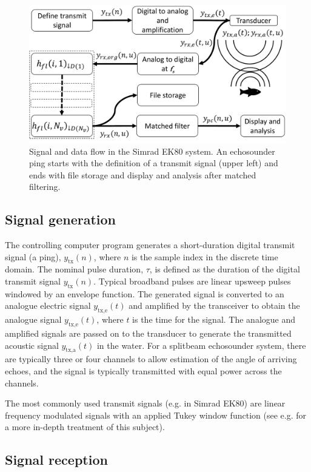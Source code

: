 \documentclass[preprint,12pt,TurnOnLineNumbers]{JASAnew}
\newcommand{\ek}{Simrad EK80}
\newcommand{\timesym}{t}
\newcommand{\samplesymt}{n}
\newcommand{\tnom}{\tau}
\newcommand{\ytxe}{y_{\textrm{tx,e}}}
\newcommand{\ytxa}{y_{\textrm{tx,a}}}
\newcommand{\ytx}{y_{\textrm{tx}}}
\begin{document}
\begin{figure}
\includegraphics[width=16cm]{Fig_ek_sys}
\caption{\label{fi:ek_sys} Signal and data flow in the \ek{} system. An echosounder ping starts with the definition of a transmit signal (upper left) and ends with file storage and display and analysis after matched filtering.}
\end{figure}

\subsection{Signal generation}

The controlling computer program generates a short-duration digital transmit signal (a ping), $\ytx(\samplesymt)$, where $\samplesymt$ is the sample index in the discrete time domain. The nominal pulse duration, $\tnom$, is defined as the duration of the digital transmit signal $\ytx(\samplesymt)$.
Typical broadband pulses are linear upsweep pulses windowed by an envelope function. The generated signal is converted to an analogue electric signal $\ytxe(\timesym)$ and amplified by the transceiver to obtain the analogue signal $\ytxe(\timesym)$, where $\timesym$ is the time for the signal. The analogue and amplified signals are passed on to the transducer to generate the transmitted acoustic signal $\ytxa(\timesym)$ in the water. For a splitbeam echosounder system, there are typically three or four channels to allow estimation of the angle of arriving echoes, and the signal is typically transmitted with equal power across the channels.

The most commonly used transmit signals (e.g. in Simrad EK80) are linear frequency modulated signals with an applied Tukey window function (see e.g. \citet{lavery2017} for a more in-depth treatment of this subject). 

\subsection{Signal reception}
\end{document}
